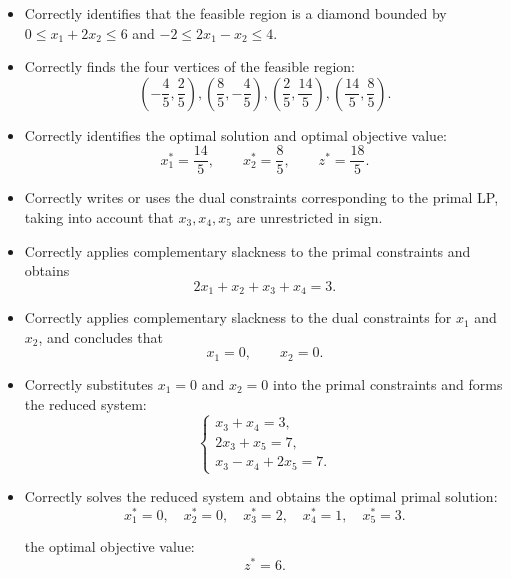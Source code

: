 \begin{itemize}
    \item Correctly identifies that the feasible region is a diamond bounded by
    $0 \leq x_1+2x_2 \leq 6$ and $-2 \leq 2x_1-x_2 \leq 4$. 

    \item Correctly finds the four vertices of the feasible region:
    \[
    \left(-\frac{4}{5},\frac{2}{5}\right),
    \left(\frac{8}{5},-\frac{4}{5}\right),
    \left(\frac{2}{5},\frac{14}{5}\right),
    \left(\frac{14}{5},\frac{8}{5}\right).
    \]

    \item Correctly identifies the optimal solution and optimal objective value:
    \[
    x_1^*=\frac{14}{5},\qquad x_2^*=\frac{8}{5},\qquad z^*=\frac{18}{5}.
    \]
\end{itemize}



\begin{itemize}
    \item Correctly writes or uses the dual constraints corresponding to the primal LP,
    taking into account that $x_3,x_4,x_5$ are unrestricted in sign. 

    \item Correctly applies complementary slackness to the primal constraints and obtains
    \[
    2x_1+x_2+x_3+x_4=3.
    \]

    \item Correctly applies complementary slackness to the dual constraints for $x_1$
    and $x_2$, and concludes that
    \[
    x_1=0,\qquad x_2=0.
    \]

    \item Correctly substitutes $x_1=0$ and $x_2=0$ into the primal constraints and forms
    the reduced system:
    \[
    \begin{cases}
    x_3+x_4=3,\\
    2x_3+x_5=7,\\
    x_3-x_4+2x_5=7.
    \end{cases}
    \]

    \item Correctly solves the reduced system and obtains the optimal primal solution:
    \[
    x_1^*=0,\quad x_2^*=0,\quad x_3^*=2,\quad x_4^*=1,\quad x_5^*=3.
    \]

    the optimal objective value:
    \[
    z^*=6.
    \]
    

\end{itemize}



